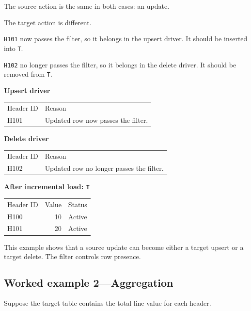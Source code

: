 \documentclass[10pt,openany,10pt]{book}
\newcounter{none}
\let\podeToprule\toprule
\let\podeMidrule\midrule
\let\podeBottomrule\bottomrule
\renewcommand{\toprule}{\arrayrulecolor{pbiGrid}\podeToprule}
\renewcommand{\midrule}{\arrayrulecolor{pbiGrid}\podeMidrule}
\renewcommand{\bottomrule}{\arrayrulecolor{pbiGrid}\podeBottomrule}
\begin{document}
The source action is the same in both cases: an update.

The target action is different.

\texttt{H101} now passes the filter, so it belongs in the upsert driver.
It should be inserted into \texttt{T}.

\texttt{H102} no longer passes the filter, so it belongs in the delete
driver. It should be removed from \texttt{T}.

\textbf{Upsert driver}

{\def\LTcaptype{none} %
\begin{longtable}[]{@{}ll@{}}
\toprule\noalign{}
Header ID & Reason \\
\midrule\noalign{}
\endhead
\bottomrule\noalign{}
\endlastfoot
H101 & Updated row now passes the filter. \\
\end{longtable}
}

\textbf{Delete driver}

{\def\LTcaptype{none} %
\begin{longtable}[]{@{}ll@{}}
\toprule\noalign{}
Header ID & Reason \\
\midrule\noalign{}
\endhead
\bottomrule\noalign{}
\endlastfoot
H102 & Updated row no longer passes the filter. \\
\end{longtable}
}

\textbf{After incremental load: \texttt{T}}

{\def\LTcaptype{none} %
\begin{longtable}[]{@{}lrl@{}}
\toprule\noalign{}
Header ID & Value & Status \\
\midrule\noalign{}
\endhead
\bottomrule\noalign{}
\endlastfoot
H100 & 10 & Active \\
H101 & 20 & Active \\
\end{longtable}
}

This example shows that a source update can become either a target
upsert or a target delete. The filter controls row presence.

\subsection{Worked example
2---Aggregation}\label{worked-example-2aggregation}

Suppose the target table contains the total line value for each header.
\end{document}
